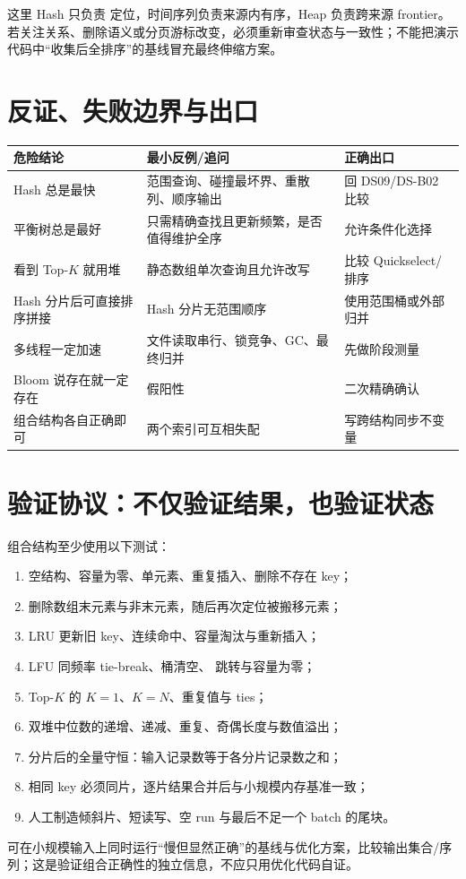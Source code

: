 \documentclass[UTF8,fontset=none,11pt,a4paper]{ctexart}
\begin{document}
这里 Hash 只负责  定位，时间序列负责来源内有序，Heap 负责跨来源 frontier。若关注关系、删除语义或分页游标改变，必须重新审查状态与一致性；不能把演示代码中“收集后全排序”的基线冒充最终伸缩方案。

\section{反证、失败边界与出口}

\begin{center}\small
\begin{tabularx}{\linewidth}{L{3.1cm}YY}
\toprule
危险结论 & 最小反例/追问 & 正确出口\\
\midrule
Hash 总是最快 & 范围查询、碰撞最坏界、重散列、顺序输出 & 回 DS09/DS-B02 比较\\
平衡树总是最好 & 只需精确查找且更新频繁，是否值得维护全序 & 允许条件化选择\\
看到 Top-$K$ 就用堆 & 静态数组单次查询且允许改写 & 比较 Quickselect/排序\\
Hash 分片后可直接排序拼接 & Hash 分片无范围顺序 & 使用范围桶或外部归并\\
多线程一定加速 & 文件读取串行、锁竞争、GC、最终归并 & 先做阶段测量\\
Bloom 说存在就一定存在 & 假阳性 & 二次精确确认\\
组合结构各自正确即可 & 两个索引可互相失配 & 写跨结构同步不变量\\
\bottomrule
\end{tabularx}
\end{center}

\section{验证协议：不仅验证结果，也验证状态}
组合结构至少使用以下测试：
\begin{enumerate}
  \item 空结构、容量为零、单元素、重复插入、删除不存在 key；
  \item 删除数组末元素与非末元素，随后再次定位被搬移元素；
  \item LRU 更新旧 key、连续命中、容量淘汰与重新插入；
  \item LFU 同频率 tie-break、桶清空、 跳转与容量为零；
  \item Top-$K$ 的 $K=1$、$K=N$、重复值与 ties；
  \item 双堆中位数的递增、递减、重复、奇偶长度与数值溢出；
  \item 分片后的全量守恒：输入记录数等于各分片记录数之和；
  \item 相同 key 必须同片，逐片结果合并后与小规模内存基准一致；
  \item 人工制造倾斜片、短读写、空 run 与最后不足一个 batch 的尾块。
\end{enumerate}
可在小规模输入上同时运行“慢但显然正确”的基线与优化方案，比较输出集合/序列；这是验证组合正确性的独立信息，不应只用优化代码自证。
\end{document}
